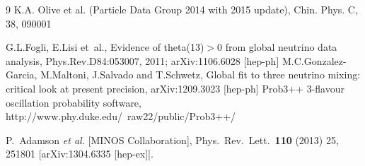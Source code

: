 \begin{thebibliography}{9}
K.A. Olive et al. (Particle Data Group 2014 with 2015 update), 
Chin. Phys. C, 38, 090001

% 
%
%
%
  G.L.Fogli, E.Lisi et~al.,
  Evidence of theta(13)$>$0 from global neutrino data analysis,
  Phys.Rev.D84:053007, 2011; arXiv:1106.6028 [hep-ph]
 M.C.Gonzalez-Garcia, M.Maltoni, J.Salvado and T.Schwetz,
 Global fit to three neutrino mixing: critical look at present precision,
 arXiv:1209.3023 [hep-ph]
%
%
%
%
 Prob3++ 3-flavour oscillation probability software,
 http://www.phy.duke.edu/~raw22/public/Prob3++/
 
  P.~Adamson {\it et al.}  [MINOS Collaboration],
  Phys.\ Rev.\ Lett.\  {\bf 110} (2013) 25,  251801
  [arXiv:1304.6335 [hep-ex]].

\end{thebibliography}


